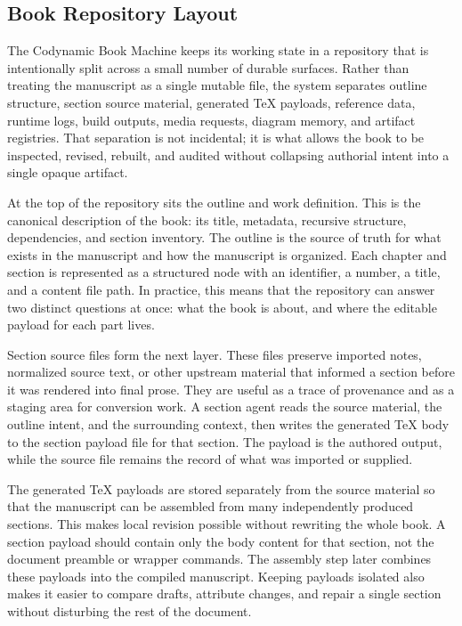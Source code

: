 \documentclass[11pt]{article}
\begin{document}

\subsection{Book Repository Layout}


The Codynamic Book Machine keeps its working state in a repository that is intentionally split across a small number of durable surfaces. Rather than treating the manuscript as a single mutable file, the system separates outline structure, section source material, generated \TeX{} payloads, reference data, runtime logs, build outputs, media requests, diagram memory, and artifact registries. That separation is not incidental; it is what allows the book to be inspected, revised, rebuilt, and audited without collapsing authorial intent into a single opaque artifact.

At the top of the repository sits the outline and work definition. This is the canonical description of the book: its title, metadata, recursive structure, dependencies, and section inventory. The outline is the source of truth for what exists in the manuscript and how the manuscript is organized. Each chapter and section is represented as a structured node with an identifier, a number, a title, and a content file path. In practice, this means that the repository can answer two distinct questions at once: what the book is about, and where the editable payload for each part lives.

Section source files form the next layer. These files preserve imported notes, normalized source text, or other upstream material that informed a section before it was rendered into final prose. They are useful as a trace of provenance and as a staging area for conversion work. A section agent reads the source material, the outline intent, and the surrounding context, then writes the generated \TeX{} body to the section payload file for that section. The payload is the authored output, while the source file remains the record of what was imported or supplied.

The generated \TeX{} payloads are stored separately from the source material so that the manuscript can be assembled from many independently produced sections. This makes local revision possible without rewriting the whole book. A section payload should contain only the body content for that section, not the document preamble or wrapper commands. The assembly step later combines these payloads into the compiled manuscript. Keeping payloads isolated also makes it easier to compare drafts, attribute changes, and repair a single section without disturbing the rest of the document.
\end{document}
